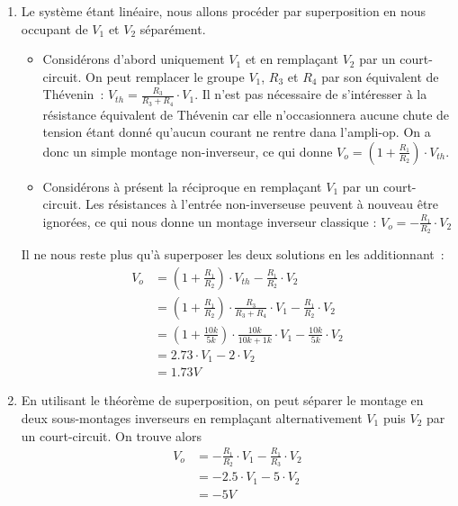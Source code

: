 \documentclass{../template/tp}
\begin{document}
{
	\begin{enumerate}[label=\alph*)]
		\item Le système étant linéaire, nous allons procéder par superposition en nous occupant de $V_1$ et $V_2$ séparément.
		\begin{itemize}
			\item Considérons d'abord uniquement $V_1$ et en remplaçant $V_2$ par un court-circuit.
			On peut remplacer le groupe $V_1$, $R_3$ et $R_4$ par son équivalent de Thévenin~: $V_{th} = \frac{R_3}{R_3 + R_4} \cdot V_1$.
			Il n'est pas nécessaire de s'intéresser à la résistance équivalent de Thévenin car elle n'occasionnera aucune chute de tension étant donné qu'aucun courant ne rentre dana l'ampli-op.
			On a donc un simple montage non-inverseur, ce qui donne $V_o = (1+\frac{R_1}{R_2}) \cdot V_{th}$.

			\item Considérons à présent la réciproque en remplaçant $V_1$ par un court-circuit.
			Les résistances à l'entrée non-inverseuse peuvent à nouveau être ignorées, ce qui nous donne un montage inverseur classique :
			$V_o = -\frac{R_1}{R_2} \cdot V_2$
		\end{itemize}

		Il ne nous reste plus qu'à superposer les deux solutions en les additionnant~:
		\begin{align*}
		V_o & = (1+\frac{R_1}{R_2}) \cdot V_{th} - \frac{R_1}{R_2} \cdot V_2 \\
		& = (1+\frac{R_1}{R_2}) \cdot \frac{R_3}{R_3 + R_4} \cdot V_1 - \frac{R_1}{R_2} \cdot V_2 \\
		& = (1+\frac{10k}{5k}) \cdot \frac{10k}{10k + 1k} \cdot V_1 - \frac{10k}{5k} \cdot V_2 \\
		& = 2.73 \cdot V_1 - 2 \cdot V_2 \\
		& = 1.73 V
		\end{align*}

		\item En utilisant le théorème de superposition, on peut séparer le montage en deux sous-montages inverseurs en remplaçant alternativement $V_1$ puis $V_2$ par un court-circuit.
		On trouve alors 
		\begin{align*}
		V_o & = -\frac{R_1}{R_2} \cdot V_1 - \frac{R_1}{R_3} \cdot V_2 \\
		& = - 2.5 \cdot V_1 - 5 \cdot V_2 \\
		& = -5V
		\end{align*}
	\end{enumerate}
}
\end{document}
